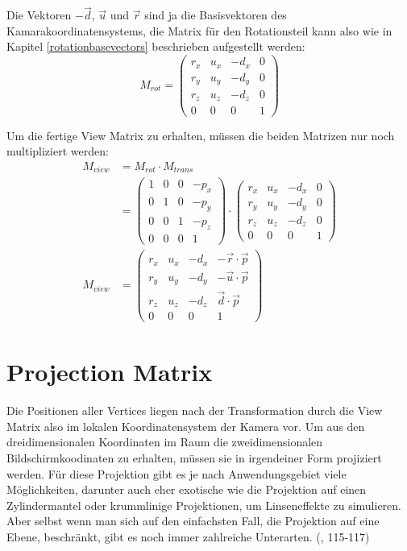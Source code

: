 Die Vektoren $-\vec d$, $\vec u$ und $\vec r$ sind ja die Basisvektoren des Kamarakoordinatensystems, die Matrix für den Rotationsteil kann also wie in Kapitel \ref{rotationbasevectors} beschrieben aufgestellt werden:
\begin{equation}
 M_{rot} =
 \begin{pmatrix}
  r_x & u_x & -d_x & 0 \\
  r_y & u_y & -d_y & 0 \\
  r_z & u_z & -d_z & 0 \\
  0 & 0 & 0 & 1
 \end{pmatrix}
\end{equation}

Um die fertige View Matrix zu erhalten, müssen die beiden Matrizen nur noch multipliziert werden:
\begin{equation}
\begin{split}
 M_{view} &= M_{rot} \cdot M_{trans} \\
 &=
 \begin{pmatrix}
  1 & 0 & 0 & -p_x \\
  0 & 1 & 0 & -p_y \\
  0 & 0 & 1 & -p_z \\
  0 & 0 & 0 & 1
 \end{pmatrix} \cdot
 \begin{pmatrix}
  r_x & u_x & -d_x & 0 \\
  r_y & u_y & -d_y & 0 \\
  r_z & u_z & -d_z & 0 \\
  0 & 0 & 0 & 1
 \end{pmatrix} \\
 M_{view} &=
 \begin{pmatrix}
  r_x & u_x & -d_x & -\vec r \cdot \vec p \\
  r_y & u_y & -d_y & -\vec u \cdot \vec p \\
  r_z & u_z & -d_z & \vec d \cdot \vec p \\
  0 & 0 & 0 & 1
 \end{pmatrix}
\end{split}
\end{equation}

\section{Projection Matrix}
\label{projection}
Die Positionen aller Vertices liegen nach der Transformation durch die View Matrix also im lokalen Koordinatensystem der Kamera vor. Um aus den dreidimensionalen Koordinaten im Raum die zweidimensionalen Bildschirmkoodinaten zu erhalten, müssen sie in irgendeiner Form projiziert werden. Für diese Projektion gibt es je nach Anwendungsgebiet viele Möglichkeiten, darunter auch eher exotische wie die Projektion auf einen Zylindermantel oder krummlinige Projektionen, um Linseneffekte zu simulieren. Aber selbst wenn man sich auf den einfachsten Fall, die Projektion auf eine Ebene, beschränkt, gibt es noch immer zahlreiche Unterarten. (\vgl \citep{script:spain}, 115-117)

